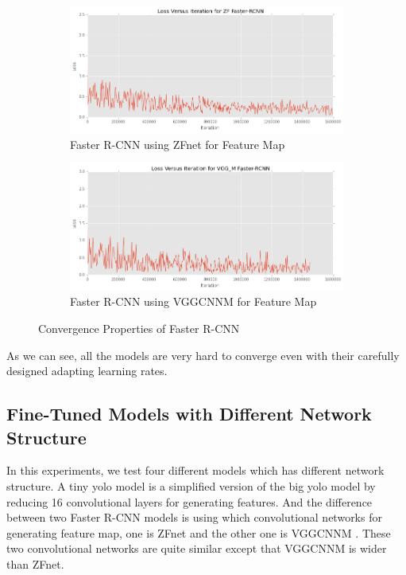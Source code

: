 \begin{figure}[H]
\centering
\begin{subfigure}[t]{.49\textwidth}
    \centering
    \includegraphics[width=1.0\linewidth]{img/FRCNN_zf_cov.png}
    \caption{Faster R-CNN using ZFnet for Feature Map}
\end{subfigure}
\begin{subfigure}[t]{.49\textwidth}
    \centering
    \includegraphics[width=1.0\linewidth]{img/FRCNN_vgg_m_cov.png}
    \caption{Faster R-CNN using VGG\textunderscore CNN\textunderscore M for Feature Map}
\end{subfigure}
\caption{Convergence Properties of Faster R-CNN}
\end{figure}

As we can see, all the models are very hard to converge even 
with their carefully designed adapting learning rates. 


\subsection{Fine-Tuned Models with Different Network Structure}
In this experiments, we test four different models which has 
different network structure.
A tiny yolo model is a simplified version of the big yolo model 
by reducing 16 convolutional layers for generating features. 
And the difference between two Faster R-CNN models
is using which convolutional networks for generating feature map,
one is ZFnet \cite{zeiler2014visualizing} and the other one is VGG\textunderscore CNN\textunderscore M \cite{chatfield2014return}. These two convolutional networks 
are quite similar except that 
VGG\textunderscore CNN\textunderscore M 
is wider than ZFnet.

